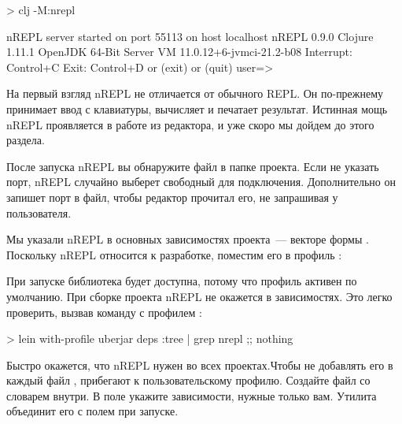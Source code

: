 \begin{english}
  \begin{text}
> clj -M:nrepl

nREPL server started on port 55113 on host localhost
nREPL 0.9.0
Clojure 1.11.1
OpenJDK 64-Bit Server VM 11.0.12+6-jvmci-21.2-b08
Interrupt: Control+C
Exit:      Control+D or (exit) or (quit)
user=>
  \end{text}
\end{english}

На первый взгляд nREPL не отличается от обычного REPL. Он по-прежнему принимает ввод с клавиатуры, вычисляет и печатает результат. Истинная мощь nREPL проявляется в работе из редактора, и уже скоро мы дойдем до этого раздела.

После запуска nREPL вы обнаружите файл  в папке проекта. Если не указать порт, nREPL случайно выберет свободный для подключения. Дополнительно он запишет порт в файл, чтобы редактор прочитал его, не запрашивая у пользователя.

Мы указали nREPL в основных зависимостях проекта~--- векторе  формы . Поскольку nREPL относится к разработке, поместим его в профиль :

\begin{english}
  \begin{clojure}
:profiles
{:dev {:dependencies [[nrepl/nrepl "0.9.0"]]}
  \end{clojure}
\end{english}

При запуске  библиотека будет доступна, потому что профиль  активен по умолчанию. При сборке проекта nREPL не окажется в зависимостях. Это легко проверить, вызвав команду  с профилем :

\begin{english}
  \begin{bash}
> lein with-profile uberjar deps :tree | grep nrepl
;; nothing
  \end{bash}
\end{english}

Быстро окажется, что nREPL нужен во всех проектах.Чтобы не добавлять его в каждый файл , прибегают к пользовательскому профилю. Создайте файл  со словарем внутри. В поле  укажите зависимости, нужные только вам. Утилита  объединит его с полем  при запуске.

